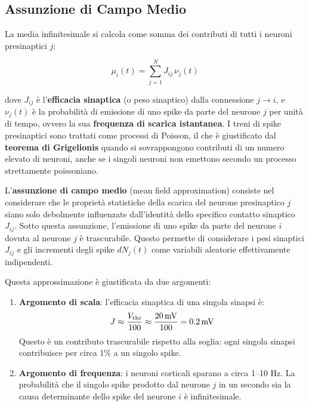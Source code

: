 \subsection{ Assunzione di Campo Medio}
La media infinitesimale si calcola come somma dei contributi di tutti i neuroni presinaptici $j$:

\begin{equation}
\mu_i(t) = \sum_{j=1}^{N} J_{ij} \, \nu_j(t)
\end{equation}

dove $J_{ij}$ è l'\textbf{efficacia sinaptica} (o peso sinaptico) dalla connessione $j \to i$, e $\nu_j(t)$ è la probabilità di emissione di uno spike da parte del neurone $j$ per unità di tempo, ovvero la sua \textbf{frequenza di scarica istantanea}. I treni di spike presinaptici sono trattati come processi di Poisson, il che è giustificato dal \textbf{teorema di Grigelionis} quando si sovrappongono contributi di un numero elevato di neuroni, anche se i singoli neuroni non emettono secondo un processo strettamente poissoniano.

L'\textbf{assunzione di campo medio} (mean field approximation) consiste nel considerare che le proprietà statistiche della scarica del neurone presinaptico $j$ siano solo debolmente influenzate dall'identità dello specifico contatto sinaptico $J_{ij}$. Sotto questa assunzione, l'emissione di uno spike da parte del neurone $i$ dovuta al neurone $j$ è trascurabile. Questo permette di considerare i pesi sinaptici $J_{ij}$ e gli incrementi degli spike $dN_j(t)$ come variabili aleatorie effettivamente indipendenti.

Questa approssimazione è giustificata da due argomenti:

\begin{enumerate}
    \item \textbf{Argomento di scala}: l'efficacia sinaptica di una singola sinapsi è:
    \begin{equation}
    J \approx \frac{V_{\rm thr}}{100} \approx \frac{20\,\text{mV}}{100} = 0.2\,\text{mV}
    \end{equation}
    Questo è un contributo trascurabile rispetto alla soglia: ogni singola sinapsi contribuisce per circa 1\% a un singolo spike.
    \item \textbf{Argomento di frequenza}: i neuroni corticali sparano a circa 1–10 Hz. La probabilità che il singolo spike prodotto dal neurone $j$ in un secondo sia la causa determinante dello spike del neurone $i$ è infinitesimale.
\end{enumerate}

